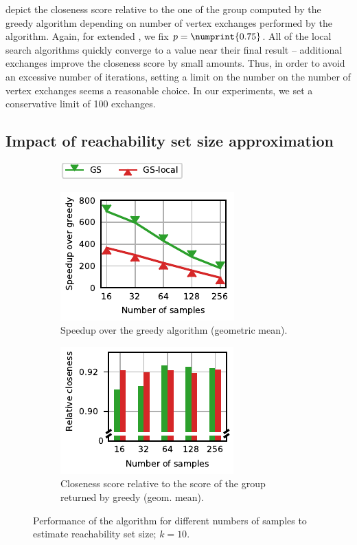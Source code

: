  depict
the closeness score relative to the one of the group computed by the greedy algorithm
depending on number of vertex exchanges performed by the algorithm. Again, for extended
\growshrink, we fix $p = \numprint{0.75}$. All of the local search algorithms quickly
converge to a value near their final result -- additional exchanges improve the
closeness score by small amounts. Thus, in order to avoid an excessive number of iterations,
setting a limit on the number on the number of vertex exchanges seems a reasonable choice.
In our experiments, we set a conservative limit of 100 exchanges.

\subsection{Impact of reachability set size approximation}
\label{sec:lsh-gc-impact-of-rss-apx}
%
\begin{figure}
\centering
\begin{subfigure}[t]{\columnwidth}
\centering
\includegraphics{./sources/plots/local-search-heu/legend-weighted.pdf}
\end{subfigure}

\begin{subfigure}[t]{.45\columnwidth}
\centering
\includegraphics{./sources/plots/local-search-heu/reach-set-size-apx-speedups.pdf}
\caption{Speedup over the greedy algorithm (geometric mean).}
\label{fig:lsh-gc-reach-set-size-apx-speedup}
\end{subfigure}\hfill
\begin{subfigure}[t]{.45\columnwidth}
\centering
\includegraphics{./sources/plots/local-search-heu/reach-set-size-apx-quality.pdf}
\caption{Closeness score relative to the score of the group returned by greedy (geom. mean).}
\label{fig:lsh-gc-reach-set-size-apx-quality}
\end{subfigure}
\caption{Performance of the \growshrink
algorithm for different numbers of samples to estimate
reachability set size; $k = 10$.}
\label{fig:lsh-gc-reach-set-size-apx}
\end{figure}

